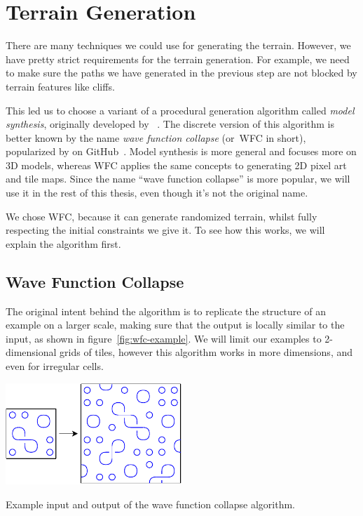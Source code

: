 \section{Terrain Generation}\label{sec:analysis-terrain-generation}

There are many techniques we could use for generating the terrain.
However, we have pretty strict requirements for the terrain generation.
For example, we need to make sure the paths we have generated in the previous step are not blocked by terrain features like cliffs.

This led us to choose a variant of a procedural generation algorithm called \emph{model synthesis}, originally developed by ~\cite{ModelSynthesis}.
The discrete version of this algorithm is better known by the name \emph{wave function collapse} (or~WFC in short), popularized by  on GitHub~\cite{WFC}.
Model synthesis is more general and focuses more on 3D models, whereas WFC applies the same concepts to generating 2D pixel art and tile maps.
Since the name \enquote{wave function collapse} is more popular, we will use it in the rest of this thesis, even though it's not the original name.

We chose WFC, because it can generate randomized terrain, whilst fully respecting the initial constraints we give it.
To see how this works, we will explain the algorithm first.

\subsection{Wave Function Collapse}

The original intent behind the algorithm is to replicate the structure of an example on a larger scale, making sure that the output is locally similar to the input, as shown in figure~\ref{fig:wfc-example}.
We will limit our examples to 2-dimensional grids of tiles, however this algorithm works in more dimensions, and even for irregular cells.

\begin{center}
    \captionsetup{type=figure}
    \includegraphics[width=0.5\textwidth]{img/WFC Example.pdf}
    \caption{Example input and output of the wave function collapse algorithm.}
    \label{fig:wfc-example}
\end{center}


